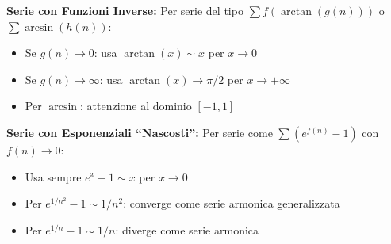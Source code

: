 \begin{info}
\textbf{Serie con Funzioni Inverse:}
Per serie del tipo \(\sum f(\arctan(g(n)))\) o \(\sum \arcsin(h(n))\):
\begin{itemize}
    \item Se \(g(n) \to 0\): usa \(\arctan(x) \sim x\) per \(x \to 0\)
    \item Se \(g(n) \to \infty\): usa \(\arctan(x) \to \pi/2\) per \(x \to +\infty\)
    \item Per \(\arcsin\): attenzione al dominio \([-1,1]\)
\end{itemize}
\end{info}

\begin{info}
\textbf{Serie con Esponenziali ``Nascosti'':}
Per serie come \(\sum (e^{f(n)} - 1)\) con \(f(n) \to 0\):
\begin{itemize}
    \item Usa sempre \(e^x - 1 \sim x\) per \(x \to 0\)
    \item Per \(e^{1/n^2} - 1 \sim 1/n^2\): converge come serie armonica generalizzata
    \item Per \(e^{1/n} - 1 \sim 1/n\): diverge come serie armonica
\end{itemize}
\end{info}
